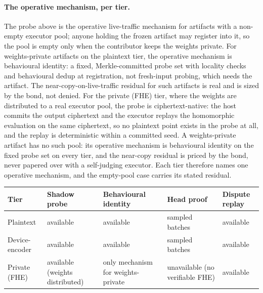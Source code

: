 \documentclass[11pt]{article}
\begin{document}
\paragraph{The operative mechanism, per tier.} The probe above
is the operative live-traffic mechanism for artifacts with a
non-empty executor pool; anyone holding the frozen artifact may
register into it, so the pool is empty only when the contributor
keeps the weights private. For weights-private artifacts on the
plaintext tier, the operative mechanism is behavioural identity:
a fixed, Merkle-committed probe set with locality checks and
behavioural dedup at registration, not fresh-input probing,
which needs the artifact. The near-copy-on-live-traffic residual
for such artifacts is real and is sized by the bond, not denied.
For the private (FHE) tier, where the weights are distributed to a
real executor pool, the probe is ciphertext-native: the
host commits the output ciphertext and the executor replays the
homomorphic evaluation on the same ciphertext, so no plaintext
point exists in the probe at all, and the replay is deterministic
within a committed seed. A weights-private artifact has no such
pool: its operative mechanism is behavioural identity on the
fixed probe set on every tier, and the near-copy residual is
priced by the bond, never papered over with a self-judging
executor. Each tier therefore names one operative mechanism, and
the empty-pool case carries its stated residual.

\begin{center}\small
    \begin{tabular}{@{}>{\raggedright\arraybackslash}p{2.2cm}>{\raggedright\arraybackslash}p{3.3cm}>{\raggedright\arraybackslash}p{3.5cm}>{\raggedright\arraybackslash}p{3.2cm}>{\raggedright\arraybackslash}p{2.6cm}@{}}
        \toprule
        \textbf{Tier}  & \textbf{Shadow probe}           & \textbf{Behavioural identity}      & \textbf{Head proof}             & \textbf{Dispute replay} \\
        \midrule
        Plaintext      & available                       & available                          & sampled batches                 & available               \\
        Device-encoder & available                       & available                          & sampled batches                 & available               \\
        Private (FHE)  & available (weights distributed) & only mechanism for weights-private & unavailable (no verifiable FHE) & available               \\
        \bottomrule
    \end{tabular}
\end{center}
\end{document}

